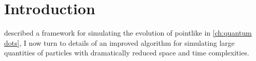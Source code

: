 \section{Introduction}

 described a framework for simulating the evolution of pointlike \qds{} in \cref{ch:quantum dots}, I now turn to details of an improved algorithm for simulating large quantities of particles with dramatically reduced space and time complexities.
